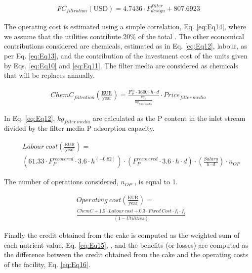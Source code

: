 \begin{refsection}[referencesCh2]
\begin{align}
	FC_{filtration}\left( \text{USD}  \right) = 4.7436\cdot F_{design}^{{filter}} + 807.6923 \label{eq:Eq11}
\end{align}

The operating cost is estimated using a simple correlation, Eq. \ref{eq:Eq14}, where we assume that the utilities contribute 20\% of the total \citep{vian1975pronostico}. The other economical contributions considered are chemicals, estimated as in Eq. \ref{eq:Eq12}, labour, as per Eq. \ref{eq:Eq13}, and the contribution of the investment cost of the units given by Eqs. \ref{eq:Eq10} and \ref{eq:Eq11}. The ﬁlter media are considered as chemicals that will be replaces annually.

\begin{align}
	{ChemC}_{filtration}\left(\frac{\text{EUR}}{\text{year}}\right) = 	\frac{F_{P}^{in} \cdot 3600 \cdot h \cdot d}{\frac{kg_P}{kg_{{filter \ media}}}} \cdot {Price}_{{filter \ media}} \label{eq:Eq12}
\end{align}

In Eq. \ref{eq:Eq12}, $kg_{{filter \ media}}$ are calculated as the P content in the inlet stream divided by the ﬁlter media P adsorption capacity.

\begin{align}
	& {{Labour \ cost}}\left( \frac{\text{EUR}}{\text{year}} \right) = \label{eq:Eq13} \\
	& \left( 61.33\cdot F_P^{recovered} \cdot 3.6\cdot{{{h}^{\left( { - 0.82} \right)}}} \right) \cdot \left( {F_P^{recovered} \cdot 3.6 \cdot h \cdot d} \right) \cdot \left( {\frac{{Salary}}{{h \cdot d}}} \right)\cdot{n_{OP}} \nonumber 
\end{align}

The number of operations considered, $n_{OP}$ , is equal to 1.

\begin{align}
	&{{Operating \ cost}}\left( \frac{\text{EUR}}{\text{year}} \right) = \label{eq:Eq14}\\ 
	&\frac{{{{ChemC}} + 1.5\cdot{{Labour \ cost}} + 0.3 \cdot Fixed \ Cost\cdot{f_i}\cdot{f_j}}}{{(1 - Utilities)}} \nonumber 
\end{align}

Finally the credit obtained from the cake is computed as the weighted sum of each nutrient value, Eq. \ref{eq:Eq15}, \citep{hernandez2017bio}, and the beneﬁts (or losses) are computed as the difference between the credit obtained from the cake and the operating costs of the facility, Eq. \ref{eq:Eq16}.


\end{refsection}
